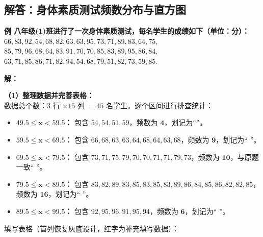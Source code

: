 ﻿%

\subsection{解答：身体素质测试频数分布与直方图}

\vspace{0.6cm}

\textbf{例 八年级(1)班进行了一次身体素质测试，每名学生的成绩如下（单位：分）：\\
$66, 83, 92, 54, 68, 82, 63, 63, 95, 73, 71, 89, 83, 64, 75,$ \\
$85, 79, 96, 68, 64, 83, 91, 70, 70, 85, 83, 89, 95, 86, 84,$ \\
$63, 71, 85, 86, 71, 82, 94, 54, 68, 79, 51, 82, 73, 59, 85.$}

\vspace{0.4cm}

\textbf{解：}

\textbf{（1）整理数据并完善表格：} \\
数据总个数：$3$ 行 $\times 15$ 列 $= 45$ 名学生。逐个区间进行排查统计：
\begin{itemize}
  \item \textbf{$\boldsymbol{49.5 \leqslant x < 59.5}$：} 包含 $54, 54, 51, 59$，频数为 $\boldsymbol{4}$，划记为“\zhengIV{}”。
  \item \textbf{$\boldsymbol{59.5 \leqslant x < 69.5}$：} 包含 $66, 68, 63, 63, 64, 68, 64, 63, 68$，频数为 $\boldsymbol{9}$，划记为“\zhengV{} \zhengIV{}”。
  \item \textbf{$\boldsymbol{69.5 \leqslant x < 79.5}$：} 包含 $73, 71, 75, 79, 70, 70, 71, 71, 79, 73$，频数为 $\boldsymbol{10}$，与原题一致“\zhengV{} \zhengV{}”。
  \item \textbf{$\boldsymbol{79.5 \leqslant x < 89.5}$：} 包含 $83, 82, 89, 83, 85, 83, 85, 83, 89, 86, 84, 85, 86, 82, 82, 85$，频数为 $\boldsymbol{16}$，划记为“\zhengV{} \zhengV{} \zhengV{} \zhengI{}”。
  \item \textbf{$\boldsymbol{89.5 \leqslant x < 99.5}$：} 包含 $92, 95, 96, 91, 95, 94$，频数为 $\boldsymbol{6}$，划记为“\zhengV{} \zhengI{}”。
\end{itemize}

填写表格（首列恢复灰底设计，红字为补充填写数据）：

